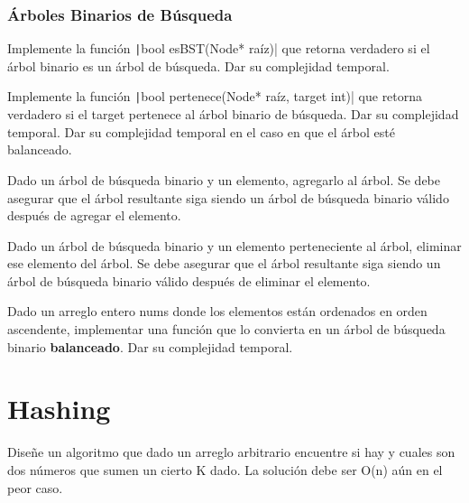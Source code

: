 \documentclass[titlepage,oneside]{book}
\begin{document}
\subsection{Árboles Binarios de Búsqueda}

\begin{Exercise}
   Implemente la función \texttt|bool esBST(Node* raíz)| que retorna verdadero si el árbol binario es un árbol de búsqueda. Dar su complejidad temporal.
\end{Exercise}

\begin{Exercise}
   Implemente la función \texttt|bool pertenece(Node* raíz, target int)| que retorna verdadero si el target pertenece al árbol binario de búsqueda.
   	\Question Dar su complejidad temporal.
	\Question Dar su complejidad temporal en el caso en que el árbol esté balanceado.
\end{Exercise}

\begin{Exercise}
   Dado un árbol de búsqueda binario y un elemento, agregarlo al árbol. Se debe asegurar que el árbol resultante siga siendo un árbol de búsqueda binario válido después de agregar el elemento.
\end{Exercise}

\begin{Exercise}
   Dado un árbol de búsqueda binario y un elemento perteneciente al árbol, eliminar ese elemento del árbol. Se debe asegurar que el árbol resultante siga siendo un árbol de búsqueda binario válido después de eliminar el elemento.
\end{Exercise}

\begin{Exercise}
   Dado un arreglo entero nums donde los elementos están ordenados en orden ascendente, implementar una función que lo convierta en un árbol de búsqueda binario \textbf{balanceado}. Dar su complejidad temporal.
\end{Exercise}

\chapter{Hashing}

\begin{Exercise}
	Diseñe un algoritmo que dado un arreglo arbitrario encuentre si hay y cuales son dos números que sumen un cierto K dado. La solución debe ser O(n) aún en el peor caso.
\end{Exercise}
\end{document}
